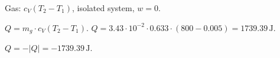 Gas: \( c_V (T_2 - T_1) \), isolated system, \( w = 0 \).  

\( Q = m_g \cdot c_V (T_2 - T_1) \).  
\( Q = 3.43 \cdot 10^{-2} \cdot 0.633 \cdot (800 - 0.005) = 1739.39 \, \text{J} \).  

\( Q = -|Q| = -1739.39 \, \text{J} \).